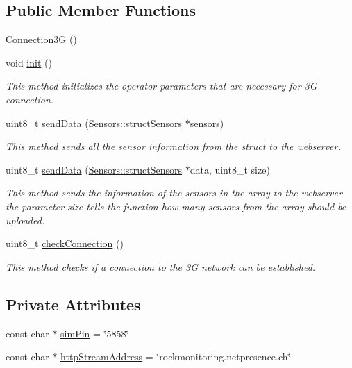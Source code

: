 \subsection*{Public Member Functions}
\begin{DoxyCompactItemize}
\item 
\hyperlink{class_connection3_g_a1a6499e5d025396d57e4ff935aa95d75}{Connection3G} ()
\item 
void \hyperlink{class_connection3_g_a1c38e7c819ccf12f3638ae4c39dff0f5}{init} ()
\begin{DoxyCompactList}\small\item\em This method initializes the operator parameters that are necessary for 3G connection. \end{DoxyCompactList}\item 
uint8\+\_\+t \hyperlink{class_connection3_g_ac676f9d075914082acee1bcb3424f043}{send\+Data} (\hyperlink{struct_sensors_1_1struct_sensors}{Sensors\+::struct\+Sensors} $\ast$sensors)
\begin{DoxyCompactList}\small\item\em This method sends all the sensor information from the struct to the webserver. \end{DoxyCompactList}\item 
uint8\+\_\+t \hyperlink{class_connection3_g_ad40ffacfd208db41d4780dd4732b9a5c}{send\+Data} (\hyperlink{struct_sensors_1_1struct_sensors}{Sensors\+::struct\+Sensors} $\ast$data, uint8\+\_\+t size)
\begin{DoxyCompactList}\small\item\em This method sends the information of the sensors in the array to the webserver the parameter size tells the function how many sensors from the array should be uploaded. \end{DoxyCompactList}\item 
uint8\+\_\+t \hyperlink{class_connection3_g_a069de56dfa1e851057cae8c0a0ccf37a}{check\+Connection} ()
\begin{DoxyCompactList}\small\item\em This method checks if a connection to the 3G network can be established. \end{DoxyCompactList}\end{DoxyCompactItemize}
\subsection*{Private Attributes}
\begin{DoxyCompactItemize}
\item 
const char $\ast$ \hyperlink{class_connection3_g_a61fdd6b524f3602a33cfb0fdb00416ac}{sim\+Pin} = \char`\"{}5858\char`\"{}
\item 
const char $\ast$ \hyperlink{class_connection3_g_acdd951b9aced5ec660a4844be385757a}{http\+Stream\+Address} = \char`\"{}rockmonitoring.\+netpresence.\+ch\char`\"{}
\end{DoxyCompactItemize}


